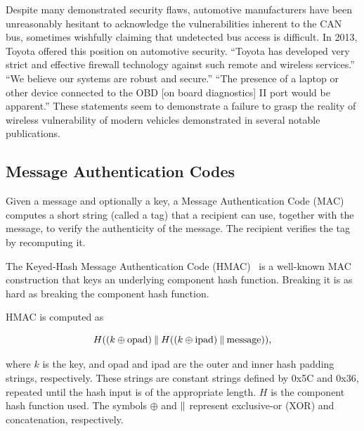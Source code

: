 Despite many demonstrated security flaws, automotive 
manufacturers have been unreasonably hesitant to acknowledge the vulnerabilities inherent to the CAN bus,
sometimes wishfully claiming that undetected bus access is difficult. In 2013, Toyota offered this position on automotive security. ``Toyota has developed very strict and effective firewall technology against such remote and wireless services.'' ``We believe our systems are robust and secure.'' ``The presence of a laptop or other device connected to the OBD [on board diagnostics] II port would be apparent.'' These statements seem to demonstrate a failure to grasp the reality of wireless vulnerability of modern vehicles demonstrated in several notable publications.


\subsection{Message Authentication Codes}

Given a message and optionally a key, a Message Authentication Code (MAC) computes a short string (called a tag) 
that a recipient can use, together with the message, to verify the authenticity of the message.  The recipient 
verifies the tag by recomputing it.

The Keyed-Hash Message Authentication Code (HMAC)~\cite{HMAC,FIPS-198-1} 
is a well-known MAC construction that keys an underlying component hash function.  
Breaking it is as hard as breaking the component hash function.

HMAC is computed as

\begin{equation}
H((k\oplus \text{opad})\mathbin{\|} H((k\oplus \text{ipad})\mathbin{\|} \text{message})) ,
\end{equation}

\noindent
where $k$ is the key, and opad and ipad are the outer and inner hash padding strings, respectively. 
These strings are constant strings defined by 0x5C and 0x36, repeated until the hash input is of the appropriate length. 
$H$ is the component hash function used. 
The symbols $\oplus$ and $\mathbin{\|}$ represent exclusive-or (XOR) and concatenation, respectively.



